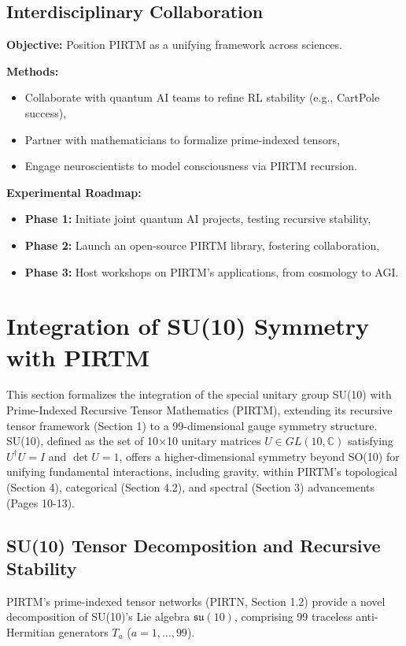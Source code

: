 \documentclass{article}
\theoremstyle{plain}
\begin{document}
\subsection{Interdisciplinary Collaboration}
\textbf{Objective:} Position PIRTM as a unifying framework across sciences.

\textbf{Methods:}
\begin{itemize}
    \item Collaborate with quantum AI teams to refine RL stability (e.g., CartPole success),
    \item Partner with mathematicians to formalize prime-indexed tensors,
    \item Engage neuroscientists to model consciousness via PIRTM recursion.
\end{itemize}

\textbf{Experimental Roadmap:}
\begin{itemize}
    \item \textbf{Phase 1:} Initiate joint quantum AI projects, testing recursive stability,
    \item \textbf{Phase 2:} Launch an open-source PIRTM library, fostering collaboration,
    \item \textbf{Phase 3:} Host workshops on PIRTM’s applications, from cosmology to AGI.
\end{itemize}

\section{Integration of SU(10) Symmetry with PIRTM}

This section formalizes the integration of the special unitary group SU(10) with Prime-Indexed Recursive Tensor Mathematics (PIRTM), extending its recursive tensor framework (Section 1) to a 99-dimensional gauge symmetry structure. SU(10), defined as the set of 10$\times$10 unitary matrices \( U \in GL(10, \mathbb{C}) \) satisfying \( U^\dagger U = I \) and \( \det U = 1 \), offers a higher-dimensional symmetry beyond SO(10) for unifying fundamental interactions, including gravity, within PIRTM’s topological (Section 4), categorical (Section 4.2), and spectral (Section 3) advancements (Pages 10-13).

\subsection{SU(10) Tensor Decomposition and Recursive Stability}

PIRTM’s prime-indexed tensor networks (PIRTN, Section 1.2) provide a novel decomposition of SU(10)’s Lie algebra \( \mathfrak{su}(10) \), comprising 99 traceless anti-Hermitian generators \( T_a \) (\( a = 1, \dots, 99 \)).
\end{document}
